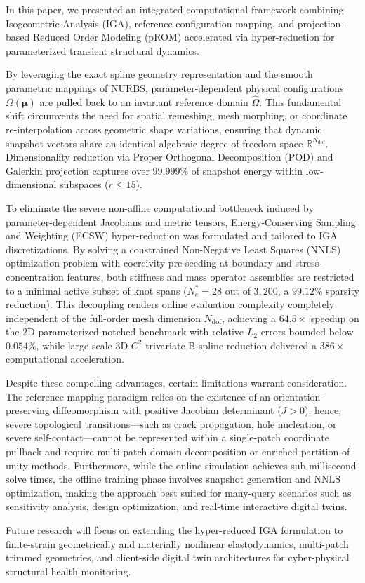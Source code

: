 In this paper, we presented an integrated computational framework combining Isogeometric Analysis (IGA), reference configuration mapping, and projection-based Reduced Order Modeling (pROM) accelerated via hyper-reduction for parameterized transient structural dynamics.

By leveraging the exact spline geometry representation and the smooth parametric mappings of NURBS, parameter-dependent physical configurations $\Omega(\bm{\mu})$ are pulled back to an invariant reference domain $\hat{\Omega}$. This fundamental shift circumvents the need for spatial remeshing, mesh morphing, or coordinate re-interpolation across geometric shape variations, ensuring that dynamic snapshot vectors share an identical algebraic degree-of-freedom space $\mathbb{R}^{N_{\text{dof}}}$. Dimensionality reduction via Proper Orthogonal Decomposition (POD) and Galerkin projection captures over $99.999\%$ of snapshot energy within low-dimensional subspaces ($r \le 15$).

To eliminate the severe non-affine computational bottleneck induced by parameter-dependent Jacobians and metric tensors, Energy-Conserving Sampling and Weighting (ECSW) hyper-reduction was formulated and tailored to IGA discretizations. By solving a constrained Non-Negative Least Squares (NNLS) optimization problem with coercivity pre-seeding at boundary and stress-concentration features, both stiffness and mass operator assemblies are restricted to a minimal active subset of knot spans ($N_e^* = 28$ out of $3,200$, a $99.12\%$ sparsity reduction). This decoupling renders online evaluation complexity completely independent of the full-order mesh dimension $N_{\text{dof}}$, achieving a $64.5\times$ speedup on the 2D parameterized notched benchmark with relative $L_2$ errors bounded below $0.054\%$, while large-scale 3D $C^2$ trivariate B-spline reduction delivered a $386\times$ computational acceleration.

Despite these compelling advantages, certain limitations warrant consideration. The reference mapping paradigm relies on the existence of an orientation-preserving diffeomorphism with positive Jacobian determinant ($J > 0$); hence, severe topological transitions—such as crack propagation, hole nucleation, or severe self-contact—cannot be represented within a single-patch coordinate pullback and require multi-patch domain decomposition or enriched partition-of-unity methods. Furthermore, while the online simulation achieves sub-millisecond solve times, the offline training phase involves snapshot generation and NNLS optimization, making the approach best suited for many-query scenarios such as sensitivity analysis, design optimization, and real-time interactive digital twins.

Future research will focus on extending the hyper-reduced IGA formulation to finite-strain geometrically and materially nonlinear elastodynamics, multi-patch trimmed geometries, and client-side digital twin architectures for cyber-physical structural health monitoring.
